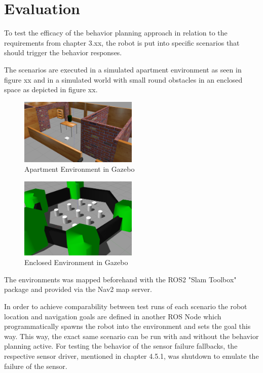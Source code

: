 \chapter{Evaluation}
\label{cha:ergebnisse}

To test the efficacy of the behavior planning approach in relation to the requirements from chapter 3.xx, the robot is put into specific scenarios that should trigger the behavior responses. 

The scenarios are executed in a simulated apartment environment as seen in figure xx and in a simulated world with small round obstacles in an enclosed space as depicted in figure xx. 

\begin{figure}
	\includegraphics[width=0.5\textwidth]{images/house_env.png}
	\caption{Apartment Environment in Gazebo}
\end{figure}

\begin{figure}
	\includegraphics[width=0.5\textwidth]{images/world_env.png}
	\caption{Enclosed Environment in Gazebo}
\end{figure}

The environments was mapped beforehand with the ROS2 "Slam Toolbox" package and provided via the Nav2 map server. 

In order to achieve comparability between test runs of each scenario the robot location and navigation goals are defined in another ROS Node which programmatically spawns the robot into the environment and sets the goal this way. This way, the exact same scenario can be run with and without the behavior planning active. For testing the behavior of the sensor failure fallbacks, the respective sensor driver, mentioned in chapter 4.5.1, was shutdown to emulate the failure of the sensor. 

